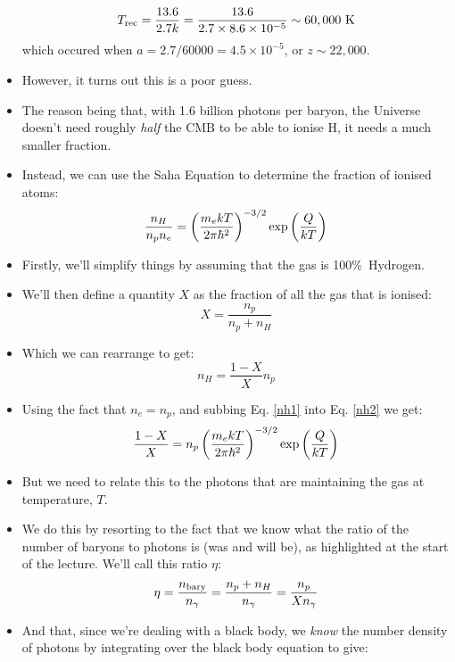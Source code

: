 \documentclass[11pt]{article}
\begin{document}
\begin{itemize}
\begin{equation}
T_{\rm rec} = \frac{13.6}{2.7k}=\frac{13.6}{2.7\times8.6\times10^{-5}}\sim60,000~{\rm K}
\end{equation}
which occured when $a=2.7/60000=4.5\times10^{-5}$, or $z\sim22,000$.
\item However, it turns out this is a poor guess.
\item The reason being that, with 1.6 billion photons per baryon, the Universe doesn't need roughly {\it half} the CMB to be able to ionise H, it needs a much smaller fraction.
\item Instead, we can use the Saha Equation to determine the fraction of ionised atoms:
\begin{equation}
\label{nh1}
    \frac{n_H}{n_pn_e} = \left(\frac{m_ekT}{2\pi\hbar^2}\right)^{-3/2}{\rm exp}\left(\frac{Q}{kT}\right)
\end{equation}
\item Firstly, we'll simplify things by assuming that the gas is 100\%\ Hydrogen.
\item We'll then define a quantity $X$ as the fraction of all the gas that is ionised:
\begin{equation}
    \label{nh2}
    X = \frac{n_p}{n_p + n_H}
\end{equation}
\item Which we can rearrange to get:
\begin{equation}
    n_H = \frac{1-X}{X}n_p
\end{equation}
\item Using the fact that $n_e=n_p$, and subbing Eq. \ref{nh1} into Eq. \ref{nh2} we get:
\begin{equation}
    \label{1mx}
    \frac{1-X}{X} = n_p\left(\frac{m_ekT}{2\pi\hbar^2}\right)^{-3/2}{\rm exp}\left(\frac{Q}{kT}\right)
\end{equation}
\item But we need to relate this to the photons that are maintaining the gas at temperature, $T$.
\item We do this by resorting to the fact that we know what the ratio of the number of baryons to photons is (was and will be), as highlighted at the start of the lecture. We'll call this ratio $\eta$:
\begin{equation}
    \label{eta}
    \eta = \frac{n_{\rm bary}}{n_\gamma} = \frac{n_p+n_H}{n_\gamma} = \frac{n_p}{Xn_\gamma}
\end{equation}
\item And that, since we're dealing with a black body, we {\it know} the number density of photons by integrating over the black body equation to give:

\end{itemize}
\end{document}
